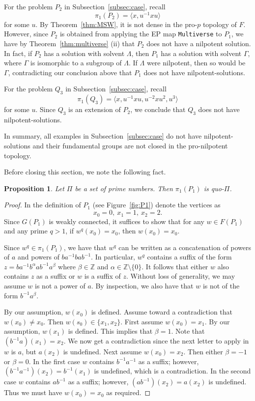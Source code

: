 \documentclass[10pt,a4paper]{amsart}
\newtheorem{proposition}[theorem]{Proposition}
\theoremstyle{definition}
\theoremstyle{definition}
\numberwithin{equation}{section}
\begin{document}
For the problem $P_2$ in Subsection~\ref{subsec:case}, recall 
$$ \pi_1(P_2)=\langle x, u^{-1}xu\rangle $$
for some $u$. By Theorem~\ref{thm:MSW}, it is not dense in the pro-$p$ topology of $F$. However, since $P_2$ is obtained from applying the EP map {\tt Multiverse} to $P_1$, we have by Theorem~\ref{thm:multiverse} (ii) that $P_2$ does not have a nilpotent solution. In fact, if $P_2$ has a solution with solvent $\Lambda$, then $P_1$ has a solution with solvent $\Gamma$, where $\Gamma$ is isomorphic to a subgroup of $\Lambda$. If $\Lambda$ were nilpotent, then so would be $\Gamma$, contradicting our conclusion above that $P_1$ does not have nilpotent-solutions. 

For the problem $Q_3$ in Subsection~\ref{subsec:case}, recall
$$ \pi_1(Q_3)=\langle x, u^{-1}xu, u^{-2}xu^2, u^3\rangle $$
for some $u$. Since $Q_3$ is an extension of $P_2$,  we conclude that $Q_3$ does not have nilpotent-solutions.

In summary, all examples in Subsection~\ref{subsec:case} do not have nilpotent-solutions and their fundamental groups are not closed in the pro-nilpotent topology.


Before closing this section, we note the following fact.

\begin{proposition} Let $\Pi$ be a set of prime numbers. Then $\pi_1(P_1)$ is quo-$\Pi$.
\end{proposition}

\begin{proof} In the definition of $P_1$ (see Figure~\ref{fig:P1}) denote the vertices as 
$$x_0=0,\ x_1=1, \ x_2=2. $$ 
Since $G(P_1)$ is weakly connected, it suffices to show that for any $w\in F(P_1)$ and any prime $q>1$, if $w^q(x_0)=x_0$, then $w(x_0)=x_0$. 

Since $w^q\in \pi_1(P_1)$, we have that $w^q$ can be written as a concatenation of powers of $a$ and powers of $ba^{-1}bab^{-1}$. In particular, $w^q$ contains a suffix of the form $z=ba^{-1}b^{\alpha}ab^{-1}a^{\beta}$ where $\beta\in \mathbb{Z}$ and $\alpha\in \mathbb{Z}\setminus\{0\}$. It follows that either $w$ also contains $z$ as a suffix or $w$ is a suffix of $z$. Without loss of generality, we may assume $w$ is not a power of $a$. By inspection, we also have that $w$ is not of the form $b^{-1}a^{\beta}$.

By our assumption, $w(x_0)$ is defined. Assume toward a contradiction that $w(x_0)\neq x_0$. Then $w(s_0)\in \{x_1, x_2\}$. First assume $w(x_0)=x_1$. By our assumption, $w(x_1)$ is defined. This implies that $\beta=1$. Note that $(b^{-1}a)(x_1)=x_2$. We now get a contradiction since the next letter to apply in $w$ is $a$, but $a(x_2)$ is undefined. Next assume $w(x_0)=x_2$. Then either $\beta=-1$ or $\beta=0$. In the first case $w$ contains $b^{-1}a^{-1}$ as a suffix; however, $(b^{-1}a^{-1})(x_2)=b^{-1}(x_1)$ is undefined, which is a contradiction. In the second case $w$ contains $ab^{-1}$ as a suffix; however, $(ab^{-1})(x_2)=a(x_2)$ is undefined. Thus we must have $w(x_0)=x_0$ as required.
\end{proof}
\end{document}
